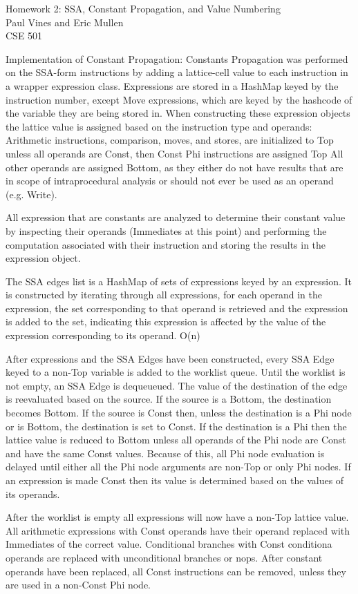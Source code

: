 \documentclass[12pt,letterpaper]{article}
\begin{document}
\begin{flushright}
Homework 2: SSA, Constant Propagation, and Value Numbering\\
Paul Vines and Eric Mullen\\
CSE 501\\
\end{flushright}

Implementation of Constant Propagation:
Constants Propagation was performed on the SSA-form instructions by adding a lattice-cell value to each instruction in a wrapper expression class. Expressions are stored in a HashMap keyed by the instruction number, except Move expressions, which are keyed by the hashcode of the variable they are being stored in. When constructing these expression objects the lattice value is assigned based on the instruction type and operands: 
Arithmetic instructions, comparison, moves, and stores, are initialized to Top unless all operands are Const, then Const
Phi instructions are assigned Top
All other operands are assigned Bottom, as they either do not have results that are in scope of intraprocedural analysis or should not ever be used as an operand (e.g. Write).

All expression that are constants are analyzed to determine their constant value by inspecting their operands (Immediates at this point) and performing the computation associated with their instruction and storing the results in the expression object.

The SSA edges list is a HashMap of sets of expressions keyed by an expression. It is constructed by iterating through all expressions, for each operand in the expression, the set corresponding to that operand is retrieved and the expression is added to the set, indicating this expression is affected by the value of the expression corresponding to its operand. O(n)

After expressions and the SSA Edges have been constructed, every SSA Edge keyed to a non-Top variable is added to the worklist queue.
Until the worklist is not empty, an SSA Edge is dequeueued. The value of the destination of the edge is reevaluated based on the source. If the source is a Bottom, the destination becomes Bottom. If the source is Const then, unless the destination is a Phi node or is Bottom, the destination is set to Const. If the destination is a Phi then the lattice value is reduced to Bottom unless all operands of the Phi node are Const and have the same Const values. Because of this, all Phi node evaluation is delayed until either all the Phi node arguments are non-Top or only Phi nodes. 
If an expression is made Const then its value is determined based on the values of its operands. 

After the worklist is empty all expressions will now have a non-Top lattice value. All arithmetic expressions with Const operands have their operand replaced with Immediates of the correct value. Conditional branches with Const conditiona operands are replaced with unconditional branches or nops.
After constant operands have been replaced, all Const instructions can be removed, unless they are used in a non-Const Phi node.
\end{document}
